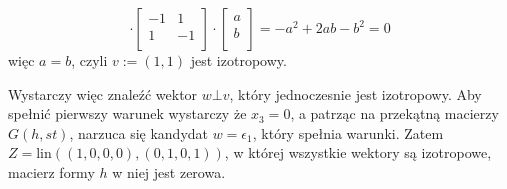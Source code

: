 \documentclass[11pt]{scrartcl}
\begin{document}
\begin{walk}
\[                  \cdot 
                  \begin{bmatrix}
                      -1 & 1 \\
                      1 & -1 \\
                  \end{bmatrix}
                  \cdot 
                  \begin{bmatrix}
                      a \\
                      b \\
                  \end{bmatrix}
                  = 
                  -a^2 + 2ab -b^2 = 0
              \]
              więc $a = b$, czyli $v := (1,1)$ jest izotropowy. 

              Wystarczy więc znaleźć wektor $w \bot v$, który jednoczesnie jest izotropowy.
              Aby spełnić pierwszy warunek wystarczy że $x_3 = 0$, a patrząc na przekątną macierzy $G(h,st)$, 
              narzuca się kandydat $w = \epsilon_1$, który spełnia warunki. 
              Zatem $Z = \text{lin} \left ( \left ( 1,0,0,0 \right ), (0,1,0,1) \right )$, 
              w której wszystkie wektory są izotropowe, macierz formy $h$ w niej jest zerowa.
          \end{walk}
          
\end{document}
